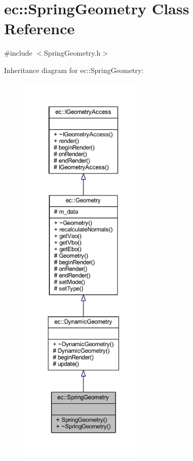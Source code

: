 \hypertarget{classec_1_1_spring_geometry}{}\section{ec\+:\+:Spring\+Geometry Class Reference}
\label{classec_1_1_spring_geometry}


{\ttfamily \#include $<$Spring\+Geometry.\+h$>$}



Inheritance diagram for ec\+:\+:Spring\+Geometry\+:\nopagebreak
\begin{figure}[H]
\begin{center}
\leavevmode
\includegraphics[height=550pt]{classec_1_1_spring_geometry__inherit__graph}
\end{center}
\end{figure}



